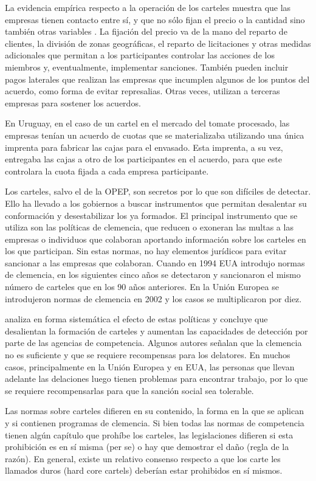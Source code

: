 \documentclass[
  12pt,
  spanish,
]{book}
\begin{document}
La evidencia empírica respecto a la operación de los carteles muestra
que las empresas tienen contacto entre sí, y que no sólo fijan el precio
o la cantidad sino también otras variables \citep{Levenstein2006}. La
fijación del precio va de la mano del reparto de clientes, la división
de zonas geográficas, el reparto de licitaciones y otras medidas
adicionales que permitan a los participantes controlar las acciones de
los miembros y, eventualmente, implementar sanciones. También pueden
incluir pagos laterales que realizan las empresas que incumplen algunos
de los puntos del acuerdo, como forma de evitar represalias. Otras
veces, utilizan a terceras empresas para sostener los acuerdos.

En Uruguay, en el caso de un cartel en el mercado del tomate procesado,
las empresas tenían un acuerdo de cuotas que se materializaba utilizando
una única imprenta para fabricar las cajas para el envasado. Esta
imprenta, a su vez, entregaba las cajas a otro de los participantes en
el acuerdo, para que este controlara la cuota fijada a cada empresa
participante.

Los carteles, salvo el de la OPEP, son secretos por lo que son difíciles
de detectar. Ello ha llevado a los gobiernos a buscar instrumentos que
permitan desalentar su conformación y desestabilizar los ya formados. El
principal instrumento que se utiliza son las políticas de clemencia, que
reducen o exoneran las multas a las empresas o individuos que colaboran
aportando información sobre los carteles en los que participan. Sin
estas normas, no hay elementos jurídicos para evitar sancionar a las
empresas que colaboran. Cuando en 1994 EUA introdujo normas de
clemencia, en los siguientes cinco años se detectaron y sancionaron el
mismo número de carteles que en los 90 años anteriores. En la Unión
Europea se introdujeron normas de clemencia en 2002 y los casos se
multiplicaron por diez.

\citet{Miller2009} analiza en forma sistemática el efecto de estas
políticas y concluye que desalientan la formación de carteles y aumentan
las capacidades de detección por parte de las agencias de competencia.
Algunos autores señalan que la clemencia no es suficiente y que se
requiere recompensas para los delatores. En muchos casos, principalmente
en la Unión Europea y en EUA, las personas que llevan adelante las
delaciones luego tienen problemas para encontrar trabajo, por lo que se
requiere recompensarlas para que la sanción social sea tolerable.

Las normas sobre carteles difieren en su contenido, la forma en la que
se aplican y si contienen programas de clemencia. Si bien todas las
normas de competencia tienen algún capítulo que prohíbe los carteles,
las legislaciones difieren si esta prohibición es en sí misma (per se) o
hay que demostrar el daño (regla de la razón). En general, existe un
relativo consenso respecto a que los carte les llamados duros (hard core
cartels) deberían estar prohibidos en sí mismos.
\end{document}
